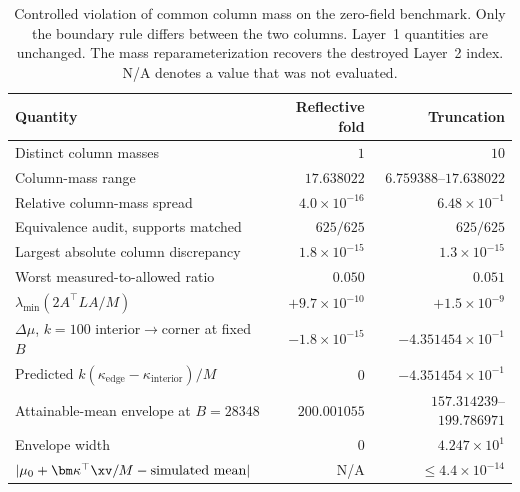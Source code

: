 \begin{table}[t]\centering\footnotesize\setlength{\tabcolsep}{4pt}
\caption{Controlled violation of common column mass on the zero-field
benchmark. Only the boundary rule differs between the two columns. Layer~1
quantities are unchanged. The mass reparameterization recovers the destroyed
Layer~2 index. N/A denotes a value that was not evaluated.}
\label{tab:kappa-violation}
\begin{tabular}{lrr}
\toprule
Quantity & Reflective fold & Truncation\\
\midrule
Distinct column masses & $1$ & $10$\\
Column-mass range & $17.638022$ & $6.759388$--$17.638022$\\
Relative column-mass spread & $4.0\times10^{-16}$ & $6.48\times10^{-1}$\\
\midrule
Equivalence audit, supports matched & $625/625$ & $625/625$\\
Largest absolute column discrepancy & $1.8\times10^{-15}$ & $1.3\times10^{-15}$\\
Worst measured-to-allowed ratio & $0.050$ & $0.051$\\
$\lambda_{\min}(2A^\top LA/M)$ & $+9.7\times10^{-10}$ & $+1.5\times10^{-9}$\\
\midrule
$\Delta\mu$, $k=100$ interior$\to$corner at fixed $B$ & $-1.8\times10^{-15}$ &
$-4.351454\times10^{-1}$\\
Predicted $k(\kappa_{\mathrm{edge}}-\kappa_{\mathrm{interior}})/M$ & $0$ &
$-4.351454\times10^{-1}$\\
\midrule
Attainable-mean envelope at $B=28348$ & $200.001055$ &
$157.314239$--$199.786971$\\
Envelope width & $0$ & $4.247\times10^{1}$\\
$|\mu_0+\bm\kappa^\top\xv/M-\text{simulated mean}|$ & N/A &
$\le4.4\times10^{-14}$\\
\bottomrule
\end{tabular}
\end{table}

